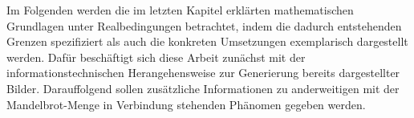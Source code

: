 
Im Folgenden werden die im letzten Kapitel erklärten mathematischen Grundlagen
unter Realbedingungen betrachtet, indem die dadurch entstehenden Grenzen
spezifiziert als auch die konkreten Umsetzungen exemplarisch dargestellt werden.
Dafür beschäftigt sich diese Arbeit zunächst mit der informationstechnischen
Herangehensweise zur Generierung bereits dargestellter Bilder.
Darauffolgend sollen zusätzliche Informationen zu anderweitigen mit der
Mandelbrot-Menge in Verbindung stehenden Phänomen gegeben werden.